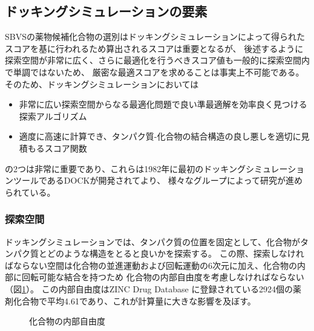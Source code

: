 \subsection{ドッキングシミュレーションの要素}\label{subsec:docking_elements}
SBVSの薬物候補化合物の選別はドッキングシミュレーションによって得られたスコアを基に行われるため算出されるスコアは重要となるが、
後述するように探索空間が非常に広く、さらに最適化を行うべきスコア値も一般的に探索空間内で単調ではないため、
厳密な最適スコアを求めることは事実上不可能である。そのため、ドッキングシミュレーションにおいては
\begin{itemize}
\item 非常に広い探索空間からなる最適化問題で良い準最適解を効率良く見つける探索アルゴリズム
\item 適度に高速に計算でき、タンパク質-化合物の結合構造の良し悪しを適切に見積もるスコア関数
\end{itemize}
の2つは非常に重要であり、これらは1982年に最初のドッキングシミュレーションツールであるDOCK\citetodo{}が開発されてより、
様々なグループによって研究が進められている。

\subsubsection{探索空間}
ドッキングシミュレーションでは、タンパク質の位置を固定として、化合物がタンパク質とどのような構造をとると良いかを探索する。
この際、探索しなければならない空間は化合物の並進運動および回転運動の6次元に加え、化合物の内部に回転可能な結合を持つため
化合物の内部自由度を考慮しなければならない（図\ref{fig:docking_freedom}）。
この内部自由度はZINC Drug Database に登録されている2924個の薬剤化合物で平均4.61であり、これが計算量に大きな影響を及ぼす。

\begin{figure}[tb]
 \begin{center}
  \caption{化合物の内部自由度}
  \label{fig:docking_freedom}
 \end{center}
\end{figure}


